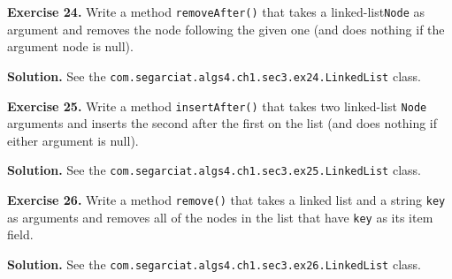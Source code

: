 \documentclass[12pt, a4paper]{article}
\newenvironment{ex}[2][Exercise]
{\par\medskip\noindent \textbf{#1 #2.}}
{\medskip}
\newenvironment{sol}[1][Solution]
{\par\medskip\noindent \textbf{#1.} }
{\medskip}
\begin{document}
	\begin{ex}{24}
		Write a method \texttt{removeAfter()} that takes a linked-list\texttt{Node}
		as argument and removes the node following the given one (and does nothing if the
		argument node is null).
	\end{ex}
	\begin{sol}
		See the \texttt{com.segarciat.algs4.ch1.sec3.ex24.LinkedList} class.
	\end{sol}
	\begin{ex}{25}
		Write a method \texttt{insertAfter()} that takes two linked-list \texttt{Node}
		arguments and inserts the second after the first on the list  (and does nothing
		if either argument is null).
	\end{ex}
	\begin{sol}
		See the \texttt{com.segarciat.algs4.ch1.sec3.ex25.LinkedList} class.
	\end{sol}
	\begin{ex}{26}
		Write a method \texttt{remove()} that takes a linked list and a string \texttt{key}
		as arguments and removes all of the nodes in the list that have \texttt{key}
		as its item field.
	\end{ex}
	\begin{sol}
		See the \texttt{com.segarciat.algs4.ch1.sec3.ex26.LinkedList} class.
	\end{sol}
	\pagebreak
	\printbibliography
\end{document}
